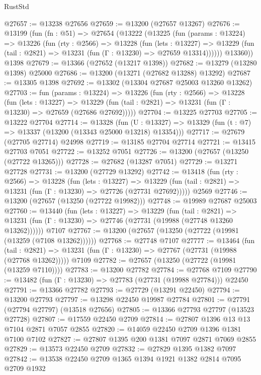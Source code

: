 \begin{lexlean}{RustStd}
\begin{coremodule}
@27657 := @13238 @27656
@27659 := @13200 (@27657 @13267)
@27676 := @13199
    (fun (fn : @51) =>
    @27654
      (@13222
        (@13225
          (fun (params : @13224) =>
          @13226
            (fun (rty : @2566) =>
            @13228
              (fun (lets : @13227) =>
              @13229 (fun (tail : @2821) => @13231 (fun (Γ : @13230) => @27659 @13314))))))
        @13360))
    @1398
@27679 := @13366 (@27652 (@13217 @1398))
@27682 := @13279 (@13280 @1398) @25000
@27686 := @13200 (@13271 (@27682 @13288) @13292)
@27687 := @13305 @1398
@27692 := @13302 (@13304 @27687 @25003 @13260 @13262)
@27703 := fun (params : @13224) =>
  @13226
    (fun (rty : @2566) =>
    @13228
      (fun (lets : @13227) =>
      @13229 (fun (tail : @2821) => @13231 (fun (Γ : @13230) => @27659 (@27686 @27692)))))
@27704 := @13225 @27703
@27705 := @13222 @27704
@27714 := @13328
    (fun (U : @13327) => @13329 (fun (t : @7) => @13337 (@13200 (@13343 @25000 @13218) @13354)))
@27717 := @27679 (@27705 @27714) @24998
@27719 := @13185 @27704 @27714
@27721 := @13415 @27703 @7051
@27722 := @13252 @7051
@27726 := @13200 (@27657 (@13250 (@27722 @13265)))
@27728 := @27682 (@13287 @7051)
@27729 := @13271 @27728
@27731 := @13200 (@27729 @13292)
@27742 := @13418
    (fun (rty : @2566) =>
    @13228
      (fun (lets : @13227) =>
      @13229 (fun (tail : @2821) => @13231 (fun (Γ : @13230) => @27726 (@27731 @27692)))))
    @2569
@27746 := @13200 (@27657 (@13250 (@27722 @19982)))
@27748 := @19989 @27687 @25003
@27760 := @13440
    (fun (lets : @13227) =>
    @13229
      (fun (tail : @2821) =>
      @13231 (fun (Γ : @13230) => @27746 (@27731 (@19988 (@27748 @13260 @13262))))))
    @7107
@27767 := @13200 (@27657 (@13250 (@27722 (@19981 (@13259 (@7108 @13262))))))
@27768 := @27748 @7107
@27777 := @13464
    (fun (tail : @2821) => @13231 (fun (Γ : @13230) => @27767 (@27731 (@19988 (@27768 @13262)))))
    @7109
@27782 := @27657 (@13250 (@27722 (@19981 (@13259 @7110))))
@27783 := @13200 @27782
@27784 := @27768 @7109
@27790 := @13482 (fun (Γ : @13230) => @27783 (@27731 (@19988 @27784))) @22450
@27791 := @13366 @27782
@27793 := @27729 (@13291 @22450)
@27794 := @13200 @27793
@27797 := @13298 @22450 @19987 @27784
@27801 := @27791 (@27794 @27797) (@13518 @27656)
@27805 := @13366 @27793 @27797 (@13523 @27728)
@27807 := @17559 @22450 @2709
@27814 := @27807 @1396 @13 @13 @7104 @2871 @7057 @2855
@27820 := @14059 @22450 @2709 @1396 @1381 @7100 @7102
@27827 := @27807 @1395 @200 @1381 @7097 @2871 @7069 @2855
@27829 := @13573 @22450 @2709
@27832 := @27829 @1395 @1382 @7097
@27842 := @13538 @22450 @2709 @1365 @1394 @1921 @1382 @2814 @7095 @2709 @1932

\end{coremodule}
\end{lexlean}
